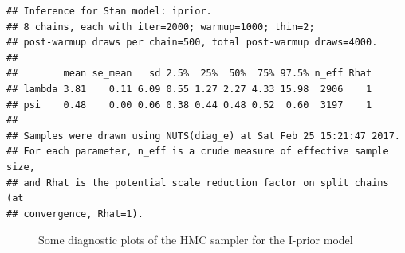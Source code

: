 \documentclass[english, 11pt]{article}
\begin{document}
\begin{knitrout}
\color{fgcolor}\begin{kframe}
\begin{verbatim}
## Inference for Stan model: iprior.
## 8 chains, each with iter=2000; warmup=1000; thin=2; 
## post-warmup draws per chain=500, total post-warmup draws=4000.
## 
##        mean se_mean   sd 2.5%  25%  50%  75% 97.5% n_eff Rhat
## lambda 3.81    0.11 6.09 0.55 1.27 2.27 4.33 15.98  2906    1
## psi    0.48    0.00 0.06 0.38 0.44 0.48 0.52  0.60  3197    1
## 
## Samples were drawn using NUTS(diag_e) at Sat Feb 25 15:21:47 2017.
## For each parameter, n_eff is a crude measure of effective sample size,
## and Rhat is the potential scale reduction factor on split chains (at 
## convergence, Rhat=1).
\end{verbatim}
\end{kframe}\begin{figure}

{\centering {}

}

\caption[Some diagnostic plots of the HMC sampler for the I-prior model]{Some diagnostic plots of the HMC sampler for the I-prior model}\label{fig:iprior.stan1.res}
\end{figure}


\end{knitrout}
\end{document}
